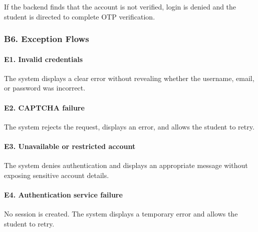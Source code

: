 \documentclass[12pt]{article}
\begin{document}
If the backend finds that the account is not verified, login is denied and the student is directed to complete OTP verification.
\par\medskip

\hypertarget{sec:b6-exception-flows}{}
\subsubsection*{B6. Exception Flows}
\par\medskip

\hypertarget{sec:e1-invalid-credentials}{}
\paragraph*{E1. Invalid credentials}
\par\medskip

The system displays a clear error without revealing whether the username, email, or password was incorrect.
\par\medskip

\hypertarget{sec:e2-captcha-failure}{}
\paragraph*{E2. CAPTCHA failure}
\par\medskip

The system rejects the request, displays an error, and allows the student to retry.
\par\medskip

\hypertarget{sec:e3-unavailable-or-restricted-account}{}
\paragraph*{E3. Unavailable or restricted account}
\par\medskip

The system denies authentication and displays an appropriate message without exposing sensitive account details.
\par\medskip

\hypertarget{sec:e4-authentication-service-failure}{}
\paragraph*{E4. Authentication service failure}
\par\medskip

No session is created. The system displays a temporary error and allows the student to retry.
\par\medskip
\end{document}
